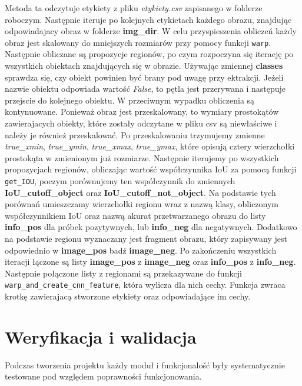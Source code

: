 \documentclass[a4paper,twoside,12pt]{book}
\begin{document}
{Metoda ta odczytuje etykiety z pliku \emph{etykiety.csv} zapisanego w folderze roboczym. Następnie iteruje po kolejnych etykietach każdego obrazu, znajdując odpowiadajacy obraz w folderze \textbf{img\_dir}. W celu przyspieszenia obliczeń każdy obraz jest skalowany do mniejszych rozmiarów przy pomocy funkcji \lstinline|warp|. Następnie obliczane są propozycje regionów, po czym rozpoczyna się iterację po wszystkich obiektach znajdujących się w obrazie. Używając zmiennej \textbf{classes} sprawdza się, czy obiekt powinien być brany pod uwagę przy ektrakcji. Jeżeli nazwie obiektu odpowiada wartość \emph{False}, to pętla jest przerywana i następuje przejscie do kolejnego obiektu. W przeciwnym wypadku obliczenia są kontynuowane. Ponieważ obraz jest przeskalowany, to wymiary prostokątów zawierajacych obiekty, które zostały odczytane w pliku csv są niewłaściwe i należy je również przeskalować. Po przeskalowaniu trzymujemy zmienne \emph{true\_xmin}, \emph{true\_ymin}, \emph{true\_xmax}, \emph{true\_ymax}, które opisują cztery wierzchołki prostokąta w zmienionym już rozmiarze. Następnie iterujemy po wszystkich propozycjach regionów, obliczając wartość współczynnika IoU za pomocą funkcji \lstinline|get_IOU|, poczym  porównujemy ten współczynnik do zmiennych \textbf{IoU\_cutoff\_object} oraz \textbf{IoU\_cutoff\_not\_object}. Na podstawie tych porównań umieszczamy wierzchołki regionu wraz z nazwą klasy, obliczonym współczynnikiem IoU oraz nazwą akurat przetwarzanego obrazu do listy \textbf{info\_pos} dla próbek pozytywnych, lub \textbf{info\_neg} dla negatywnych. Dodatkowo na podstawie regionu wyznaczany jest fragment obrazu, który zapisywany jest odpowiednio w \textbf{image\_pos} badź \textbf{image\_neg}. Po zakończeniu wszystkich iteracji łączone są listy \textbf{image\_pos} z \textbf{image\_neg} oraz \textbf{info\_pos} z \textbf{info\_neg}. Następnie połączone listy z regionami są przekazywane do funkcji \lstinline|warp_and_create_cnn_feature|, która wylicza dla nich cechy. Funkcja zwraca krotkę zawierajacą stworzone etykiety oraz odpowiadające im cechy.




\chapter{Weryfikacja i walidacja}
{Podczas tworzenia projektu każdy moduł i funkcjonalość były systematycznie testowane pod względem poprawności funkcjonowania.}
}
\end{document}

